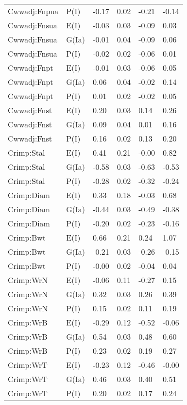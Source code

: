 \begin{center}
\begin{longtable}{|p{1.1in}|p{0.7in}|p{0.7in}|p{0.6in}|p{0.6in}|p{0.6in}|}
  Cwwadj:Fnpua & P(I) & -0.17 & 0.02 & -0.21 & -0.14 \\ 
  Cwwadj:Fnsua & E(I) & -0.03 & 0.03 & -0.09 & 0.03 \\ 
  Cwwadj:Fnsua & G(Ia) & -0.01 & 0.04 & -0.09 & 0.06 \\ 
  Cwwadj:Fnsua & P(I) & -0.02 & 0.02 & -0.06 & 0.01 \\ 
  Cwwadj:Fnpt & E(I) & -0.01 & 0.03 & -0.06 & 0.05 \\ 
  Cwwadj:Fnpt & G(Ia) & 0.06 & 0.04 & -0.02 & 0.14 \\ 
  Cwwadj:Fnpt & P(I) & 0.01 & 0.02 & -0.02 & 0.05 \\ 
  Cwwadj:Fnst & E(I) & 0.20 & 0.03 & 0.14 & 0.26 \\ 
  Cwwadj:Fnst & G(Ia) & 0.09 & 0.04 & 0.01 & 0.16 \\ 
  Cwwadj:Fnst & P(I) & 0.16 & 0.02 & 0.13 & 0.20 \\ 
  Crimp:Stal & E(I) & 0.41 & 0.21 & -0.00 & 0.82 \\ 
  Crimp:Stal & G(Ia) & -0.58 & 0.03 & -0.63 & -0.53 \\ 
  Crimp:Stal & P(I) & -0.28 & 0.02 & -0.32 & -0.24 \\ 
  Crimp:Diam & E(I) & 0.33 & 0.18 & -0.03 & 0.68 \\ 
  Crimp:Diam & G(Ia) & -0.44 & 0.03 & -0.49 & -0.38 \\ 
  Crimp:Diam & P(I) & -0.20 & 0.02 & -0.23 & -0.16 \\ 
  Crimp:Bwt & E(I) & 0.66 & 0.21 & 0.24 & 1.07 \\ 
  Crimp:Bwt & G(Ia) & -0.21 & 0.03 & -0.26 & -0.15 \\ 
  Crimp:Bwt & P(I) & -0.00 & 0.02 & -0.04 & 0.04 \\ 
  Crimp:WrN & E(I) & -0.06 & 0.11 & -0.27 & 0.15 \\ 
  Crimp:WrN & G(Ia) & 0.32 & 0.03 & 0.26 & 0.39 \\ 
  Crimp:WrN & P(I) & 0.15 & 0.02 & 0.11 & 0.19 \\ 
  Crimp:WrB & E(I) & -0.29 & 0.12 & -0.52 & -0.06 \\ 
  Crimp:WrB & G(Ia) & 0.54 & 0.03 & 0.48 & 0.60 \\ 
  Crimp:WrB & P(I) & 0.23 & 0.02 & 0.19 & 0.27 \\ 
  Crimp:WrT & E(I) & -0.23 & 0.12 & -0.46 & -0.00 \\ 
  Crimp:WrT & G(Ia) & 0.46 & 0.03 & 0.40 & 0.51 \\ 
  Crimp:WrT & P(I) & 0.20 & 0.02 & 0.17 & 0.24 \\ 

\end{longtable}
\end{center}
